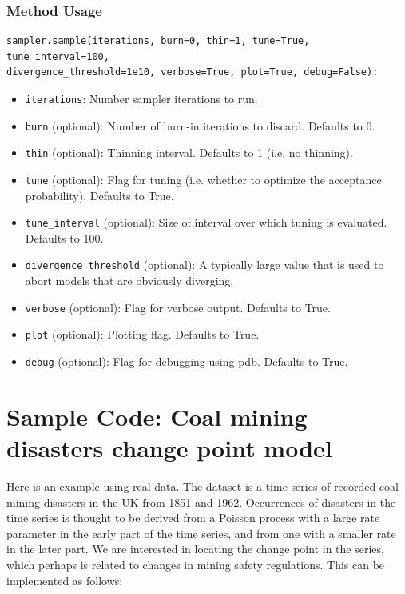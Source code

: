 \documentclass[]{book}
\begin{document}
\subsubsection{Method Usage}
\begin{verbatim}
sampler.sample(iterations, burn=0, thin=1, tune=True, tune_interval=100,
divergence_threshold=1e10, verbose=True, plot=True, debug=False):
\end{verbatim}
\begin{itemize}

\item \verb=iterations=: Number sampler iterations to run.

\item \verb=burn= (optional): Number of burn-in iterations to discard. Defaults to 0.

\item \verb=thin= (optional): Thinning interval. Defaults to 1 (i.e. no thinning).

\item \verb=tune= (optional): Flag for tuning (i.e. whether to optimize the acceptance probability). Defaults to True.

\item \verb=tune_interval= (optional): Size of interval over which tuning is evaluated. Defaults to 100.

\item \verb=divergence_threshold= (optional): A typically large value that is used to abort models that are obviously diverging.

\item \verb=verbose= (optional): Flag for verbose output. Defaults to True.

\item \verb=plot= (optional): Plotting flag. Defaults to True.

\item \verb=debug= (optional): Flag for debugging using pdb. Defaults to True.
\end{itemize}

\section{Sample Code: Coal mining disasters change point model}

Here is an example using real data. The dataset is a time series of recorded coal mining disasters in the UK from 1851 and 1962. Occurrences of disasters in the time series is thought to be derived from a Poisson process with a large rate parameter in the early part of the time series, and from one with a smaller rate in the later part. We are interested in locating the change point in the series, which perhaps is related to changes in mining safety regulations. This can be implemented as follows:
\end{document}
